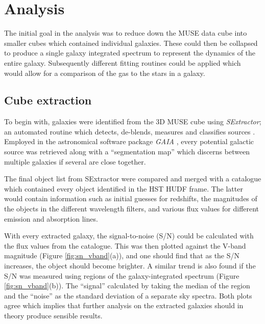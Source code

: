 \documentclass[12pt, twocolumn]{revtex4-1}    %
\begin{document}


\section{Analysis} 
\label{sec:analysis}

The initial goal in the analysis was to reduce down the MUSE data cube into smaller cubes which contained individual galaxies. These could then be collapsed to produce a single galaxy integrated spectrum to represent the dynamics of the entire galaxy. Subsequently different fitting routines could be applied which would allow for a comparison of the gas to the stars in a galaxy.

\subsection{Cube extraction}

To begin with, galaxies were identified from the 3D MUSE cube using \textit{SExtractor}; an automated routine which detects, de-blends, measures and classifies sources \citep{bertin_sextractor}. Employed in the astronomical software package \textit{GAIA} \citep{currie_starlink}, every potential galactic source was retrieved along with a ``segmentation map'' which discerns between multiple galaxies if several are close together. 

The final object list from SExtractor were compared and merged with a catalogue which contained every object identified in the HST HUDF frame. The latter would contain information such as initial guesses for redshifts, the magnitudes of the objects in the different wavelength filters, and various flux values for different emission and absorption lines.


With every extracted galaxy, the signal-to-noise (S/N) could be calculated with the flux values from the catalogue. This was then plotted against the V-band magnitude (Figure \ref{fig:sn_vband}(a)), and one should find that as the S/N increases, the object should become brighter. A similar trend is also found if the S/N was measured using regions of the galaxy-integrated spectrum (Figure \ref{fig:sn_vband}(b)). The ``signal'' calculated by taking the median of the region and the ``noise'' as the standard deviation of a separate sky spectra. Both plots agree which implies that further analysis on the extracted galaxies should in theory produce sensible results. 
\end{document}
